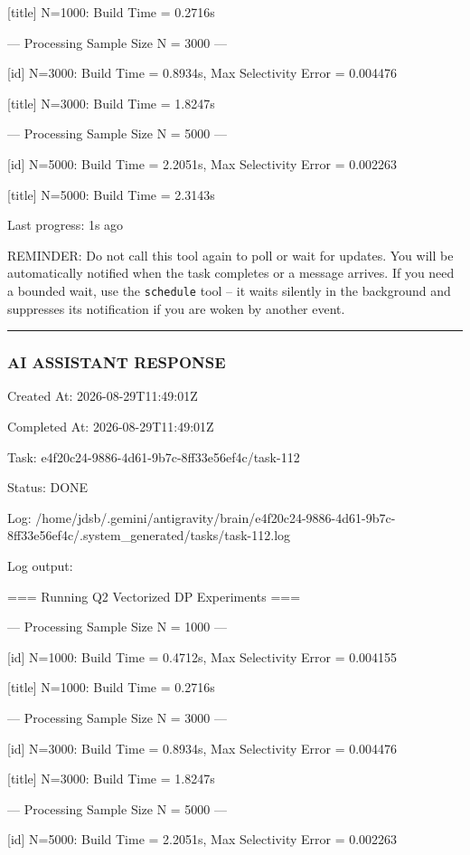 \documentclass[11pt,a4paper]{article}
\begin{document}
{[title] N=1000: Build Time = 0.2716s


--- Processing Sample Size N = 3000 ---

[id] N=3000: Build Time = 0.8934s, Max Selectivity Error = 0.004476

[title] N=3000: Build Time = 1.8247s


--- Processing Sample Size N = 5000 ---

[id] N=5000: Build Time = 2.2051s, Max Selectivity Error = 0.002263

[title] N=5000: Build Time = 2.3143s


Last progress: 1s ago



REMINDER: Do not call this tool again to poll or wait for updates. You will be automatically notified when the task completes or a message arrives. If you need a bounded wait, use the \texttt{schedule} tool -- it waits silently in the background and suppresses its notification if you are woken by another event.


\hrule

\subsubsection{AI ASSISTANT RESPONSE}

Created At: 2026-08-29T11:49:01Z

Completed At: 2026-08-29T11:49:01Z

Task: e4f20c24-9886-4d61-9b7c-8ff33e56ef4c/task-112

Status: DONE

Log: /home/jdsb/.gemini/antigravity/brain/e4f20c24-9886-4d61-9b7c-8ff33e56ef4c/.system\_generated/tasks/task-112.log

Log output:

=== Running Q2 Vectorized DP Experiments ===


--- Processing Sample Size N = 1000 ---

[id] N=1000: Build Time = 0.4712s, Max Selectivity Error = 0.004155

[title] N=1000: Build Time = 0.2716s


--- Processing Sample Size N = 3000 ---

[id] N=3000: Build Time = 0.8934s, Max Selectivity Error = 0.004476

[title] N=3000: Build Time = 1.8247s


--- Processing Sample Size N = 5000 ---

[id] N=5000: Build Time = 2.2051s, Max Selectivity Error = 0.002263

}
\end{document}
